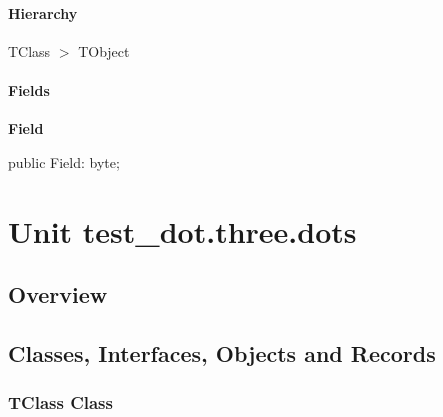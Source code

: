 \documentclass{report}
\newif\ifpdf
\begin{document}
\subsubsection*{\large{\textbf{Hierarchy}}\normalsize\hspace{1ex}\hfill}
TClass {$>$} TObject
\subsubsection*{\large{\textbf{Fields}}\normalsize\hspace{1ex}\hfill}
\begin{list}{}{
\setlength{\itemindent}{0cm}
\setlength{\listparindent}{0cm}
\setlength{\leftmargin}{\evensidemargin}
\addtolength{\leftmargin}{\tmplength}
\settowidth{\labelsep}{X}
\addtolength{\leftmargin}{\labelsep}
\setlength{\labelwidth}{\tmplength}
}
\label{test_dot.one_dot.TClass-Field}
\item[\textbf{Field}\hfill]
\ifpdf
\begin{flushleft}
\fi
\begin{ttfamily}
public Field: byte;\end{ttfamily}

\ifpdf
\end{flushleft}
\fi


\par  \end{list}
\chapter{Unit test{\_}dot.three.dots}
\label{test_dot.three.dots}
\section{Overview}
\begin{description}
\item[\texttt{\begin{ttfamily}TClass\end{ttfamily} Class}]
\end{description}
\section{Classes, Interfaces, Objects and Records}
\ifpdf
\subsection*{\large{\textbf{TClass Class}}\normalsize\hspace{1ex}\hrulefill}
\else
\end{document}
